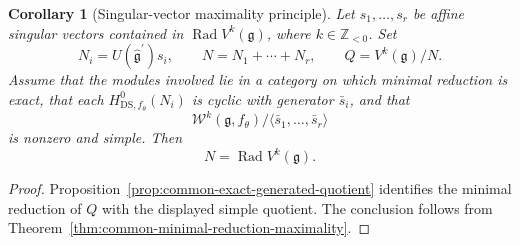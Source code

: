 \documentclass[11pt,reqno]{amsart}
\newtheorem{corollary}[theorem]{Corollary}
\theoremstyle{definition}
\theoremstyle{remark}
\begin{document}
\begin{corollary}[Singular-vector maximality principle]

Let $s_1,\ldots,s_r$ be affine singular vectors contained in
$\operatorname{Rad}V^k(\mathfrak g)$, where $k\in\mathbb Z_{<0}$.  Set
\[
 N_i=U(\widehat{\mathfrak g}^{\prime})s_i,
 \qquad
 N=N_1+\cdots+N_r,
 \qquad
 Q=V^k(\mathfrak g)/N.
\]
Assume that the modules involved lie in a category on which minimal
reduction is exact, that each
$H^0_{\mathrm{DS},f_\theta}(N_i)$ is cyclic with generator $\bar s_i$, and
that
\[
 \mathcal W^k(\mathfrak g,f_\theta)
 \big/\langle\bar s_1,\ldots,\bar s_r\rangle
\]
is nonzero and simple.  Then
\[
 N=\operatorname{Rad}V^k(\mathfrak g).
\]
\end{corollary}

\begin{proof}
Proposition~\ref{prop:common-exact-generated-quotient} identifies the
minimal reduction of $Q$ with the displayed simple quotient.  The conclusion
follows from Theorem~\ref{thm:common-minimal-reduction-maximality}.
\end{proof}
\end{document}
